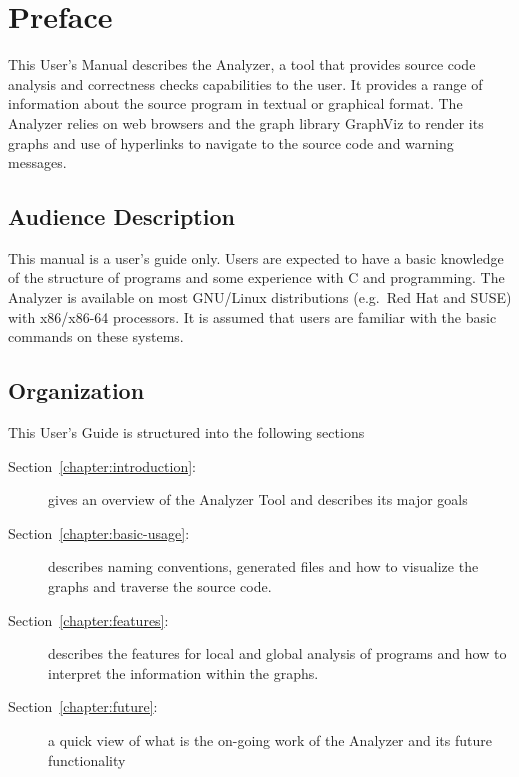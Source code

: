 \section*{Preface}

This User's Manual describes the \openshmem Analyzer, a tool that
provides source code analysis and correctness checks capabilities to
the user. It provides a range of information about the source program
in textual or graphical format. The \openshmem Analyzer relies on web
browsers and the graph library GraphViz to render its graphs and use
of hyperlinks to navigate to the source code and warning messages.

\subsection*{Audience Description}

This manual is a user's guide only. Users are expected to have a basic
knowledge of the structure of programs and some experience with C and
\openshmem programming. The \openshmem Analyzer is available on most
GNU/Linux distributions (e.g.\ Red Hat and SUSE) with x86/x86-64
processors. It is assumed that users are familiar with the basic
commands on these systems.

\subsection*{Organization}

This User's Guide is structured into the following sections

\begin{description}
\item[Section~\ref{chapter:introduction}:~]
  gives an overview of the \openshmem Analyzer Tool and describes its
  major goals
\item[Section~\ref{chapter:basic-usage}:~]
  describes naming conventions, generated files and how to visualize
  the graphs and traverse the source code.
\item[Section~\ref{chapter:features}:~]
  describes the features for local and global analysis of \openshmem
  programs and how to interpret the information within the graphs.
\item [Section~\ref{chapter:future}:~] a quick
  view of what is the on-going work of the \openshmem Analyzer and its
  future functionality
\end{description}
